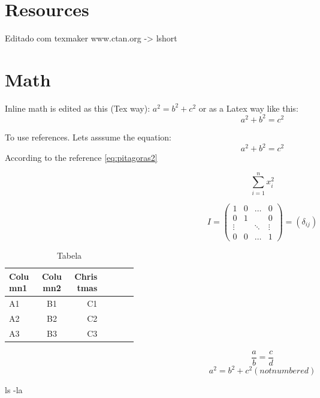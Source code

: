 \section*{Resources}
Editado com texmaker
www.ctan.org -> lshort

\section*{Math}
Inline math is edited as this (Tex way): $a^2 = b^2 + c^2$ or as a Latex way like this:
\begin{equation}
	a^2 + b^2 = c^2 \label{eq:pitagoras1}
\end{equation}

To use references. Lets asssume the equation:
\begin{displaymath}
	a^2 + b^2 = c^2 \label{eq:pitagoras2}
\end{displaymath}
According to the reference \ref{eq:pitagoras2}

\[
\sum_{i=1}^n x_i^2
\]

\[
I =
\left(
\begin{array}{cccc}
1 & 0 & \ldots & 0 \\
0 & 1 & & 0 \\
\vdots & & \ddots & \vdots \\
0 & 0 & \ldots & 1
\end{array}
\right)
= \left(\delta_{ij}\right)
\]

\begin{table*}
\begin{center}
\begin{tabular}{|l|c|r| p{0.25\linewidth} |}
\hline
Column1 & Column2 & Christmas \\
\hline
A1 & B1 & C1 \\
\hline
A2 & B2 & C2 \\
\hline
A3 & B3 & C3 \\
\hline
\end{tabular}
\end{center}
\caption{Tabela}
\label{tab:tabela-letras}
\end{table*}

\begin{equation}
\frac{a}{b} = \frac{c}{d}
\end{equation}
\begin{displaymath}
	a^2 = b^2 + c^2 (not numbered)
\end{displaymath}

\newcommand{\aliasl}{ls -la}
\aliasl
